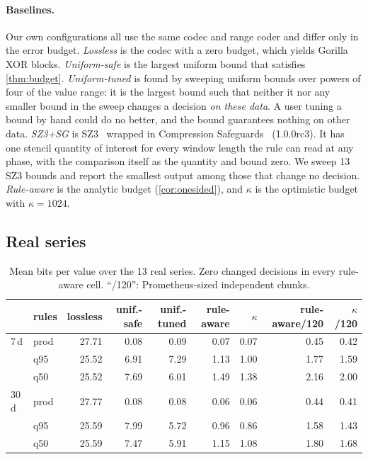 \paragraph{Baselines.} Our own configurations all use the same codec and
range coder and differ only in the error budget. \emph{Lossless} is the
codec with a zero budget, which yields Gorilla XOR blocks.
\emph{Uniform-safe} is the largest uniform bound that satisfies
\cref{thm:budget}. \emph{Uniform-tuned} is found by sweeping uniform
bounds over powers of four of the value range: it is the largest bound
such that neither it nor any smaller bound in the sweep changes a decision
\emph{on these data}. A user tuning a bound by hand could do no better,
and the bound guarantees nothing on other data. \emph{SZ3+SG} is
SZ3~\cite{liang2023sz3} wrapped in Compression
Safeguards~\cite{tyree2026safeguards} (1.0.0rc3). It has one stencil
quantity of interest for every window length the rule can read at any
phase, with the comparison itself as the quantity and bound zero. We sweep
13 SZ3 bounds and report the smallest output among those that change no
decision. \emph{Rule-aware} is the analytic budget (\cref{cor:onesided}),
and \emph{$\kappa$} is the optimistic budget with $\kappa = 1024$.

\subsection{Real series}
\label{sec:eval-real}

\begin{table}[t]
\centering
\caption{Mean bits per value over the 13 real series. Zero changed decisions
in every rule-aware cell. ``/120'': Prometheus-sized independent chunks.}
\label{tab:real}
\begin{tabular}{llrrrrrrr}
\toprule
 & rules & lossless & unif.-safe & unif.-tuned & rule-aware & $\kappa$ & rule-aware/120 & $\kappa$/120 \\
\midrule
7\,d  & prod & 27.71 & 0.08 & 0.09 & 0.07 & 0.07 & 0.45 & 0.42 \\
      & q95  & 25.52 & 6.91 & 7.29 & 1.13 & 1.00 & 1.77 & 1.59 \\
      & q50  & 25.52 & 7.69 & 6.01 & 1.49 & 1.38 & 2.16 & 2.00 \\
\midrule
30\,d & prod & 27.77 & 0.08 & 0.08 & 0.06 & 0.06 & 0.44 & 0.41 \\
      & q95  & 25.59 & 7.99 & 5.72 & 0.96 & 0.86 & 1.58 & 1.43 \\
      & q50  & 25.59 & 7.47 & 5.91 & 1.15 & 1.08 & 1.80 & 1.68 \\
\bottomrule
\end{tabular}
\end{table}

